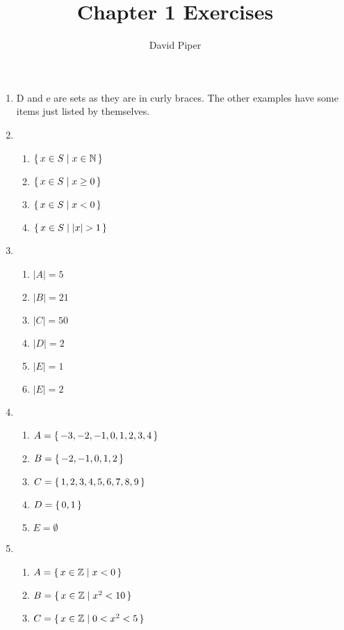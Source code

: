 \documentclass[12pt]{article}
\title{Chapter 1 Exercises}
\author{David Piper}
\begin{document}
  \maketitle

  \begin{enumerate}[label=1.\arabic*]
    \item D and e are sets as they are in curly braces.
    The other examples have some items just listed by themselves.
    \item
      \begin{enumerate}[label=(\alph*)]
        \item $\set{x \in S \mid x \in \mathbb{N}}$
        \item $\set{x \in S \mid x \geq 0}$
        \item $\set{x \in S \mid x < 0}$
        \item $\set{x \in S \mid \abs{x} > 1}$
      \end{enumerate}
    \item
      \begin{enumerate}[label=(\alph*)]
        \item $|A|=5$
        \item $|B|=21$
        \item $|C|=50$
        \item $|D|=2$
        \item $|E|=1$
        \item $|E|=2$
      \end{enumerate}
    \item
      \begin{enumerate}[label=(\alph*)]
        \item $A = \set{-3, -2, -1, 0, 1, 2, 3, 4}$
        \item $B = \set{-2, -1, 0, 1, 2}$
        \item $C = \set{1,2,3,4,5,6,7,8,9}$
        \item $D = \set{0, 1}$
        \item $E = \emptyset$
      \end{enumerate}
    \item
      \begin{enumerate}[label=(\alph*)]
        \item $A = \set{x \in \mathbb{Z} \mid x < 0}$
        \item $B = \set{x \in \mathbb{Z} \mid x^2 < 10}$
        \item $C = \set{x \in \mathbb{Z} \mid 0 < x^2 < 5}$
      \end{enumerate}

\end{enumerate}
\end{document}
